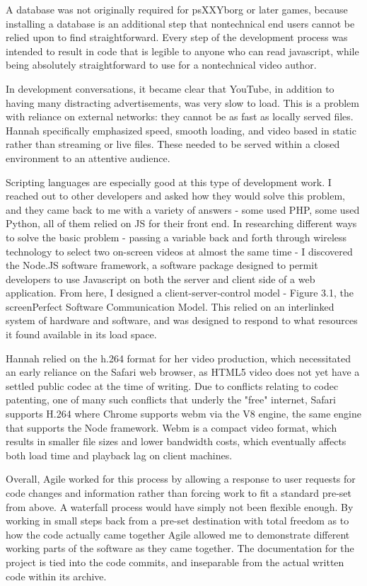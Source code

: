 A database was not originally required for psXXYborg or later games, because installing a database is an additional step that nontechnical end users cannot be relied upon to find straightforward. Every step of the development process was intended to result in code that is legible to anyone who can read javascript, while being absolutely straightforward to use for a nontechnical video author. 

In development conversations, it became clear that YouTube, in addition to having many distracting advertisements, was very slow to load. This is a problem with reliance on external networks: they cannot be as fast as locally served files. Hannah specifically emphasized speed, smooth loading, and video based in static rather than streaming or live files. These needed to be served within a closed environment to an attentive audience. 

Scripting languages are especially good at this type of development work. I reached out to other developers and asked how they would solve this problem, and they came back to me with a variety of answers - some used PHP, some used Python, all of them relied on JS for their front end. In researching different ways to solve the basic problem - passing a variable back and forth through wireless technology to select two on-screen videos at almost the same time - I discovered the Node.JS software framework, a software package designed to permit developers to use Javascript on both the server and client side of a web application. From here, I designed a client-server-control model - Figure 3.1, the screenPerfect Software Communication Model. This relied on an interlinked system of hardware and software, and was designed to respond to what resources it found available in its load space. 

Hannah relied on the h.264 format for her video production, which necessitated an early reliance on the Safari web browser, as HTML5 video does not yet have a settled public codec at the time of writing. Due to conflicts relating to codec patenting, one of many such conflicts that underly the "free" internet, Safari supports H.264 where Chrome supports webm via the V8 engine, the same engine that supports the Node framework. Webm is a compact video format, which results in smaller file sizes and lower bandwidth costs, which eventually affects both load time and playback lag on client machines. 

Overall, Agile worked for this process by allowing a response to user requests for code changes and information rather than forcing work to fit a standard pre-set from above. A waterfall process would have simply not been flexible enough. By working in small steps back from a pre-set destination with total freedom as to how the code actually came together Agile allowed me to demonstrate different working parts of the software as they came together. The documentation for the project is tied into the code commits, and inseparable from the actual written code within its archive.

